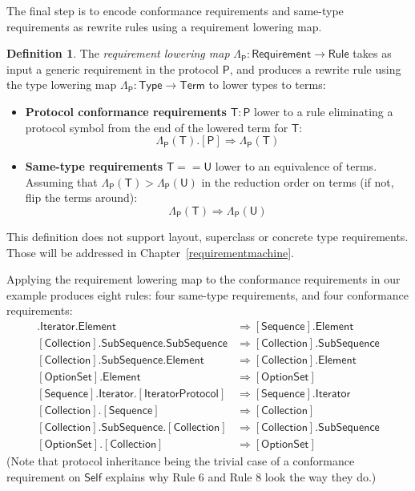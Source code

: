 \documentclass[a4paper,headsepline,bibliography=totoc,toc=flat,fleqn,twoside=semi]{scrbook}
\theoremstyle{definition}
\newtheorem{definition}{Definition}[chapter]
\theoremstyle{definition}
\theoremstyle{definition}
\newcommand{\namesym}[1]{\mathsf{#1}}
\newcommand{\genericparam}[1]{\bm{\mathsf{#1}}}
\newcommand{\proto}[1]{\bm{\mathsf{#1}}}
\newcommand{\protosym}[1]{[\proto{#1}]}
\begin{document}
The final step is to encode conformance requirements and same-type requirements as rewrite rules using a requirement lowering map.
\begin{definition}\label{reqlowering1} The \emph{requirement lowering map} $\Lambda_{\proto{P}}\colon\namesym{Requirement}\rightarrow\namesym{Rule}$ takes as input a generic requirement in the protocol $\proto{P}$, and produces a rewrite rule using the type lowering map $\Lambda_{\proto{P}}\colon\namesym{Type}\rightarrow\namesym{Term}$ to lower types to terms:
\begin{itemize}
\item \textbf{Protocol conformance requirements} $\namesym{T}\colon\proto{P}$ lower to a rule eliminating a protocol symbol from the end of the lowered term for $\namesym{T}$:
\[\Lambda_{\proto{P}}(\namesym{T}).\protosym{P} \Rightarrow \Lambda_{\proto{P}}(\namesym{T})\]
\item \textbf{Same-type requirements} $\namesym{T}==\namesym{U}$ lower to an equivalence of terms. Assuming that $\Lambda_{\proto{P}}(\namesym{T}) > \Lambda_{\proto{P}}(\namesym{U})$ in the reduction order on terms (if not, flip the terms around):
\[\Lambda_{\proto{P}}(\namesym{T}) \Rightarrow \Lambda_{\proto{P}}(\namesym{U})\]
\end{itemize}
This definition does not support layout, superclass or concrete type requirements. Those will be addressed in Chapter~\ref{requirementmachine}.
\end{definition}
Applying the requirement lowering map to the conformance requirements in our example produces eight rules: four same-type requirements, and four conformance requirements:
\begin{align}
\protosym{Sequence}.\namesym{Iterator}.\namesym{Element} &\Rightarrow \protosym{Sequence}.\namesym{Element}\tag{1}\\
\protosym{Collection}.\namesym{SubSequence}.\namesym{SubSequence} &\Rightarrow \protosym{Collection}.\namesym{SubSequence}\tag{2}\\
\protosym{Collection}.\namesym{SubSequence}.\namesym{Element} &\Rightarrow \protosym{Collection}.\namesym{Element}\tag{3}\\
\protosym{OptionSet}.\namesym{Element} &\Rightarrow \protosym{OptionSet}\tag{4}\\
\protosym{Sequence}.\namesym{Iterator}.\protosym{IteratorProtocol} &\Rightarrow \protosym{Sequence}.\namesym{Iterator}\tag{5}\\
\protosym{Collection}.\protosym{Sequence} &\Rightarrow \protosym{Collection}\tag{6}\\
\protosym{Collection}.\namesym{SubSequence}.\protosym{Collection} &\Rightarrow \protosym{Collection}.\namesym{SubSequence}\tag{7}\\
\protosym{OptionSet}.\protosym{Collection} &\Rightarrow \protosym{OptionSet}\tag{8}
\end{align}
(Note that protocol inheritance being the trivial case of a conformance requirement on $\genericparam{Self}$ explains why Rule 6 and Rule 8 look the way they do.)
\end{document}
